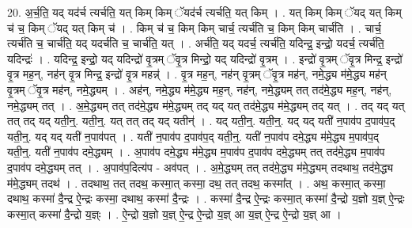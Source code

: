 \documentclass[17pt]{extarticle}
\begin{document}
20. अ॒र्च॒ति॒ यद् यद॑र्च त्यर्चति॒ यत् किम् किम् ॅयद॑र्च त्यर्चति॒ यत् किम् । . यत् किम् किम् ॅयद् यत् किम् च॑ च॒ किम् ॅयद् यत् किम् च॑ । . किम् च॑ च॒ किम् किम् चार्च॒ त्यर्च॑ति च॒ किम् किम् चार्च॑ति । . चार्च॒ त्यर्च॑ति च॒ चार्च॑ति॒ यद् यदर्च॑ति च॒ चार्च॑ति॒ यत् । . अर्च॑ति॒ यद् यदर्च॒ त्यर्च॑ति॒ यदिन्द्र॒ इन्द्रो॒ यदर्च॒ त्यर्च॑ति॒ यदिन्द्रः॑ । . यदिन्द्र॒ इन्द्रो॒ यद् यदिन्द्रो॑ वृ॒त्रम् ॅवृ॒त्र मिन्द्रो॒ यद् यदिन्द्रो॑ वृ॒त्रम् । . इन्द्रो॑ वृ॒त्रम् ॅवृ॒त्र मिन्द्र॒ इन्द्रो॑ वृ॒त्र मह॒न्, नह॑न् वृ॒त्र मिन्द्र॒ इन्द्रो॑ वृ॒त्र महन्न्॑ । . वृ॒त्र मह॒न्, नह॑न् वृ॒त्रम् ॅवृ॒त्र मह॑न्, नमे॒द्ध्य म॑मे॒द्ध्य मह॑न् वृ॒त्रम् ॅवृ॒त्र मह॑न्, नमे॒द्ध्यम् । . अह॑न्, नमे॒द्ध्य म॑मे॒द्ध्य मह॒न्, नह॑न्, नमे॒द्ध्यम् तत् तद॑मे॒द्ध्य मह॒न्, नह॑न्, नमे॒द्ध्यम् तत् । . अ॒मे॒द्ध्यम् तत् तद॑मे॒द्ध्य म॑मे॒द्ध्यम् तद् यद् यत् तद॑मे॒द्ध्य म॑मे॒द्ध्यम् तद् यत् । . तद् यद् यत् तत् तद् यद् यती॒न्॒. यती॒न्॒. यत् तत् तद् यद् यतीन्॑ । . यद् यती॒न्॒. यती॒न्॒. यद् यद् यती॑ न॒पाव॑प द॒पाव॑प॒द् यती॒न्॒. यद् यद् यती॑ न॒पाव॑पत् । . यती॑ न॒पाव॑प द॒पाव॑प॒द् यती॒न्॒. यती॑ न॒पाव॑प दमे॒द्ध्य म॑मे॒द्ध्य म॒पाव॑प॒द् यती॒न्॒. यती॑ न॒पाव॑प दमे॒द्ध्यम् । . अ॒पाव॑प दमे॒द्ध्य म॑मे॒द्ध्य म॒पाव॑प द॒पाव॑प दमे॒द्ध्यम् तत् तद॑मे॒द्ध्य म॒पाव॑प द॒पाव॑प दमे॒द्ध्यम् तत् । . अ॒पाव॑प॒दित्य॑प - अव॑पत् । . अ॒मे॒द्ध्यम् तत् तद॑मे॒द्ध्य म॑मे॒द्ध्यम् तदथाथ॒ तद॑मे॒द्ध्य म॑मे॒द्ध्यम् तदथ॑ । . तदथाथ॒ तत् तदथ॒ कस्मा॒त् कस्मा॒ दथ॒ तत् तदथ॒ कस्मा᳚त् । . अथ॒ कस्मा॒त् कस्मा॒ दथाथ॒ कस्मा॑ दै॒न्द्र ऐ॒न्द्रः कस्मा॒ दथाथ॒ कस्मा॑ दै॒न्द्रः । . कस्मा॑ दै॒न्द्र ऐ॒न्द्रः कस्मा॒त् कस्मा॑ दै॒न्द्रो य॒ज्ञो य॒ज्ञ् ऐ॒न्द्रः कस्मा॒त् कस्मा॑ दै॒न्द्रो य॒ज्ञ्ः । . ऐ॒न्द्रो य॒ज्ञो य॒ज्ञ् ऐ॒न्द्र ऐ॒न्द्रो य॒ज्ञ् आ य॒ज्ञ् ऐ॒न्द्र ऐ॒न्द्रो य॒ज्ञ् आ । \newline
\end{document}
